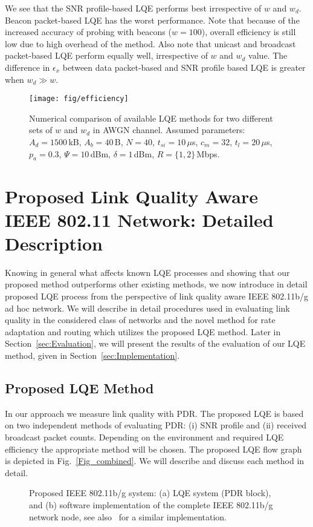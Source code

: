\documentclass[11pt,draftclsnofoot,journal,onecolumn]{IEEEtran}
\begin{document}
We see that the SNR profile-based LQE performs best irrespective of $w$ and $w_d$. Beacon packet-based LQE has the worst performance. Note that because of the increased accuracy of probing with beacons ($w=100$), overall efficiency is still low due to high overhead of the method. Also note that unicast and broadcast packet-based LQE perform equally well, irrespective of $w$ and $w_d$ value. The difference in $\epsilon_x$ between data packet-based and SNR profile based LQE is greater when $w_{d}\gg w$.

\begin{figure}
\centering
\texttt{[image: fig/efficiency]}
\caption{Numerical comparison of available LQE methods for two different sets of $w$ and $w_d$ in AWGN channel. Assumed parameters: $A_d=1500$\,kB, $A_b=40$\,B, $N=40$, $t_{si}=10$\,$\mu$s, $c_m=32$, $t_l=20$\,$\mu$s, $p_a=0.3$, $\Psi=10$\,dBm, $\delta=1$\,dBm, $R=\{1,2\}$\,Mbps.}
\label{fig:method_comp}
\end{figure}

\section{Proposed Link Quality Aware IEEE 802.11 Network: Detailed Description}
\label{sec:Proposed_system}

Knowing in general what affects known LQE processes and showing that our proposed method outperforms other existing methods, we now introduce in detail proposed LQE process from the perspective of link quality aware IEEE 802.11b/g ad hoc network. We will describe in detail procedures used in evaluating link quality in the considered class of networks and the novel method for rate adaptation and routing which utilizes the proposed LQE method. Later in Section~\ref{sec:Evaluation}, we will present the results of the evaluation of our LQE method, given in Section~\ref{sec:Implementation}.

\subsection{Proposed LQE Method}
\label{sec:lqe_proposed}

In our approach we measure link quality with PDR. The proposed LQE is based on two independent methods of evaluating PDR: (i) SNR profile and (ii) received broadcast packet counts. Depending on the environment and required LQE efficiency the appropriate method will be chosen. The proposed LQE flow graph is depicted in Fig.~\ref{Fig_combined}.  We will describe and discuss each method in detail.
\begin{figure}
\centering
{}
\caption{Proposed IEEE 802.11b/g system: (a) LQE system (PDR block), and (b) software implementation of the complete IEEE 802.11b/g network node, see also~\cite[Fig. 1]{zhou_2009_CCNC} for a similar implementation.}
\end{figure}
\end{document}
